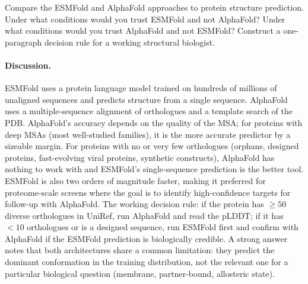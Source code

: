 \begin{exercise}
Compare the ESMFold and AlphaFold approaches to protein structure
prediction. Under what conditions would you trust ESMFold and not
AlphaFold? Under what conditions would you trust AlphaFold and not
ESMFold? Construct a one-paragraph decision rule for a working
structural biologist.

\paragraph{Discussion.}
ESMFold uses a protein language model trained on hundreds of millions
of unaligned sequences and predicts structure from a single sequence.
AlphaFold uses a multiple-sequence alignment of orthologues and a
template search of the PDB. AlphaFold's accuracy depends on the
quality of the MSA; for proteins with deep MSAs (most well-studied
families), it is the more accurate predictor by a sizeable margin.
For proteins with no or very few orthologues (orphans, designed
proteins, fast-evolving viral proteins, synthetic constructs),
AlphaFold has nothing to work with and ESMFold's single-sequence
prediction is the better tool. ESMFold is also two orders of
magnitude faster, making it preferred for proteome-scale screens
where the goal is to identify high-confidence targets for follow-up
with AlphaFold. The working decision rule: if the protein has $\geq
50$ diverse orthologues in UniRef, run AlphaFold and read the pLDDT;
if it has $< 10$ orthologues or is a designed sequence, run ESMFold
first and confirm with AlphaFold if the ESMFold prediction is
biologically credible. A strong answer notes that both architectures
share a common limitation: they predict the dominant conformation in
the training distribution, not the relevant one for a particular
biological question (membrane, partner-bound, allosteric state).
\end{exercise}

